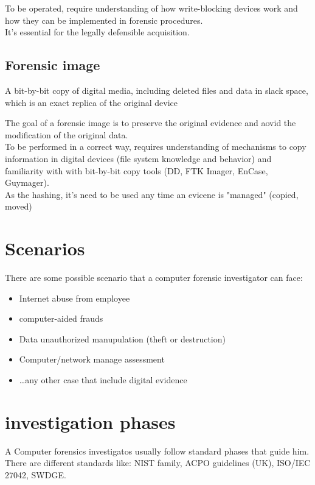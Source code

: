 To be operated, require understanding of how write-blocking devices work
and how they can be implemented in forensic procedures. \\

It's essential for the legally defensible acquisition.

\subsection{Forensic image}

\begin{boxH}
  A bit-by-bit copy of digital media, including deleted files and
  data in slack space, which is an exact replica of the original device
\end{boxH}

The goal of a forensic image is to preserve the original evidence and aovid the modification
of the original data. \\

To be performed in a correct way, requires understanding of mechanisms to copy information
in digital devices (file system knowledge and behavior) and familiarity with  with bit-by-bit copy tools
(DD, FTK Imager, EnCase, Guymager). \\

As the hashing, it's need to be used any time an evicene is "managed" (copied, moved)

\section{Scenarios}
There are some possible scenario that a computer forensic investigator can face:
\begin{itemize}[itemsep=0pt]
  \item Internet abuse from employee
  \item computer-aided frauds
  \item Data unauthorized manupulation (theft or destruction)
  \item Computer/network manage assessment
  \item \dots any other case that include digital evidence
\end{itemize}

\section{investigation phases}

A Computer forensics investigatos usually follow standard phases that guide him. There are different standards like: NIST family, ACPO guidelines (UK), ISO/IEC 27042, SWDGE.

